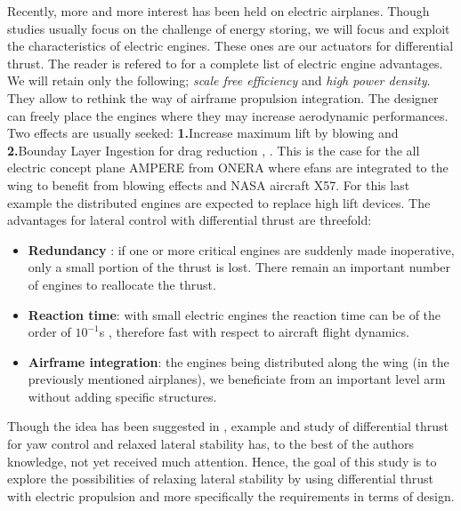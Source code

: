 Recently, more and more interest has been held on electric airplanes. Though studies usually focus on the challenge of energy storing, we will focus and exploit the characteristics of electric engines. These ones are our actuators for differential thrust. The reader is refered to \cite{MisconceptionMoore} for a complete list of electric engine advantages. We will retain only the following; \emph{scale free efficiency} and \emph{high power density}. They allow to rethink the way of airframe propulsion integration. The designer can freely place the engines where they may increase aerodynamic performances. Two effects are usually seeked: \textbf{1.}Increase maximum lift by blowing and \textbf{2.}Bounday Layer Ingestion for drag reduction \cite{Assessment_of_DEP}, \cite{Turboelec_prop_analysis_nasa}. This is the case for the all electric concept plane AMPERE from ONERA \cite{Ampere_concept} where efans are integrated to the wing to benefit from blowing effects and NASA aircraft X57\cite{DesignPerfSceptor}. For this last example the distributed engines are expected to replace high lift devices.
The advantages for lateral control with differential thrust are threefold:
\begin{itemize}
	\item \textbf{Redundancy} : if one or more critical engines are suddenly made inoperative, only a small portion of the thrust is lost. There remain an important number of engines to reallocate the thrust.
	\item \textbf{Reaction time}: with small electric engines the reaction time can be of the order of $10^{-1}$s \cite{ActionneurElectric}, therefore fast with respect to aircraft flight dynamics.
	\item \textbf{Airframe integration}: the engines being distributed along the wing (in the previously mentioned airplanes), we beneficiate from an important level arm without adding specific structures.
\end{itemize}


Though the idea has been suggested in \cite{Turboelec_prop_analysis_nasa}, example and study of differential thrust for yaw control and relaxed lateral stability has, to the best of the authors knowledge, not yet received much attention. Hence, the goal of this study is to explore the possibilities of relaxing lateral stability by using differential thrust with electric propulsion and more specifically the requirements in terms of design.

